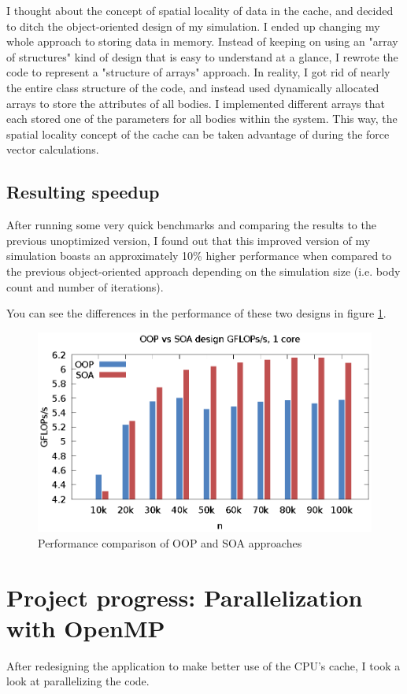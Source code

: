 \documentclass[journal]{IEEEtran}
\begin{document}
		I thought about the concept of spatial locality of data in the cache, and decided to ditch the object-oriented design of my simulation. I ended up changing my whole approach to storing data in memory. Instead of keeping on using an "array of structures" kind of design that is easy to understand at a glance, I rewrote the code to represent a "structure of arrays" approach. In reality, I got rid of nearly the entire class structure of the code, and instead used dynamically allocated arrays to store the attributes of all bodies. I implemented different arrays that each stored one of the parameters for all bodies within the system. This way, the spatial locality concept of the cache can be taken advantage of during the force vector calculations.
		
		\subsection*{Resulting speedup}
			After running some very quick benchmarks and comparing the results to the previous unoptimized version, I found out that this improved version of my simulation boasts an approximately 10\% higher performance when compared to the previous object-oriented approach depending on the simulation size (i.e. body count and number of iterations).
			
			You can see the differences in the performance of these two designs in figure \ref{oopsoa}.		
			
			\begin{figure}[ht]			
				\centering
				\includegraphics[width=.5\textwidth]{gnuplot/oop_vs_arr.eps}
				\caption{\label{oopsoa}Performance comparison of OOP and SOA approaches}
			\end{figure} 
	
	\section{Project progress: Parallelization with OpenMP}
	
		After redesigning the application to make better use of the CPU's cache, I took a look at parallelizing the code.
		
\end{document}
